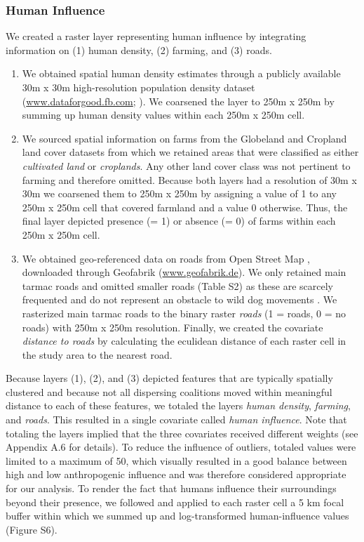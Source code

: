 \documentclass[abstract=on,10pt,a4paper,bibliography=totocnumbered]{article}
\begin{document}
\subsubsection{Human Influence}
We created a raster layer representing human influence by integrating
information on (1) human density, (2) farming, and (3) roads.

\begin{enumerate}[label = (\arabic*)]

  \item We obtained spatial human density estimates through a publicly available
  30m x 30m high-resolution population density dataset
  (\url{www.dataforgood.fb.com}; \citealp{Facebook.2019}). We coarsened the
  layer to 250m x 250m by summing up human density values within each 250m x
  250m cell.

  \item We sourced spatial information on farms from the Globeland
  \citep{Chen.2015} and Cropland \citep{Xiong.2017} land cover datasets from
  which we retained areas that were classified as either \textit{cultivated
  land} or \textit{croplands}. Any other land cover class was not pertinent to
  farming and therefore omitted. Because both layers had a resolution of 30m x
  30m we coarsened them to 250m x 250m by assigning a value of 1 to any 250m x
  250m cell that covered farmland and a value 0 otherwise. Thus, the final layer
  depicted presence (= 1) or absence (= 0) of farms within each 250m x 250m
  cell.

  \item We obtained geo-referenced data on roads from Open Street Map
  \citep{OpenStreetMap.2019}, downloaded through Geofabrik
  (\url{www.geofabrik.de}). We only retained main tarmac roads and omitted
  smaller roads (Table S2) as these are scarcely frequented and do not represent
  an obstacle to wild dog movements \citep{Abrahms.2016}. We rasterized main
  tarmac roads to the binary raster \textit{roads} (1 = roads, 0 = no roads)
  with 250m x 250m resolution. Finally, we created the covariate
  \textit{distance to roads} by calculating the eculidean distance of each
  raster cell in the study area to the nearest road.

\end{enumerate}

\noindent Because layers (1), (2), and (3) depicted features that are typically
spatially clustered and because not all dispersing coalitions moved within
meaningful distance to each of these features, we totaled the layers
\textit{human density}, \textit{farming}, and \textit{roads}. This resulted in a
single covariate called \textit{human influence}. Note that totaling the layers
implied that the three covariates received different weights (see Appendix A.6
for details). To reduce the influence of outliers, totaled values were limited
to a maximum of 50, which visually resulted in a good balance between high and
low anthropogenic influence and was therefore considered appropriate for our
analysis. To render the fact that humans influence their surroundings beyond
their presence, we followed \cite{Elliot.2014} and applied to each raster cell a
5 km focal buffer within which we summed up and log-transformed human-influence
values (Figure S6).
\end{document}
